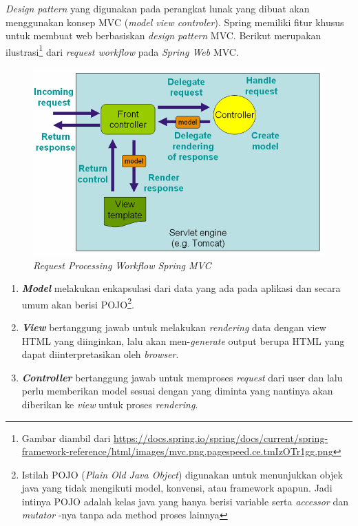 \textit{Design pattern} yang digunakan pada perangkat lunak yang dibuat akan menggunakan konsep MVC (\textit{model view controler}). Spring memiliki fitur khusus untuk membuat web berbasiskan \textit{design pattern} MVC. Berikut merupakan ilustrasi\footnote{Gambar diambil dari \url{https://docs.spring.io/spring/docs/current/spring-framework-reference/html/images/mvc.png.pagespeed.ce.tmIzOTr1gg.png}} dari \textit{request workflow} pada \textit{Spring Web} MVC.
\begin{figure}[h]
	\centering
	\includegraphics[scale=0.5]{GambarIO/mvc_springdocs}
	\caption[Request Processing Workflow Spring MVC]{\textit{Request Processing Workflow Spring MVC}}
	\label{fig:Request Processing Workflow Spring MVC}
\end{figure}

\begin{enumerate}
	\item \textit{\textbf{Model}} melakukan enkapsulasi dari data yang ada pada aplikasi dan secara umum akan berisi POJO\footnote{Istilah POJO (\textit{Plain Old Java Object}) digunakan untuk menunjukkan objek java yang tidak mengikuti model, konvensi, atau framework apapun. Jadi intinya POJO adalah kelas java yang hanya berisi variable serta \textit{accessor} dan \textit{mutator} -nya tanpa ada method proses lainnya}.
	
	\item \textit{\textbf{View}} bertanggung jawab untuk melakukan \textit{rendering} data dengan view HTML yang diinginkan, lalu akan men-\textit{generate} output berupa HTML yang dapat diinterpretasikan oleh \textit{browser}.

	\item \textit{\textbf{Controller}} bertanggung jawab untuk memproses \textit{request} dari user dan lalu perlu memberikan model sesuai dengan yang diminta yang nantinya akan diberikan ke \textit{view} untuk proses \textit{rendering}.
	
\end{enumerate}

